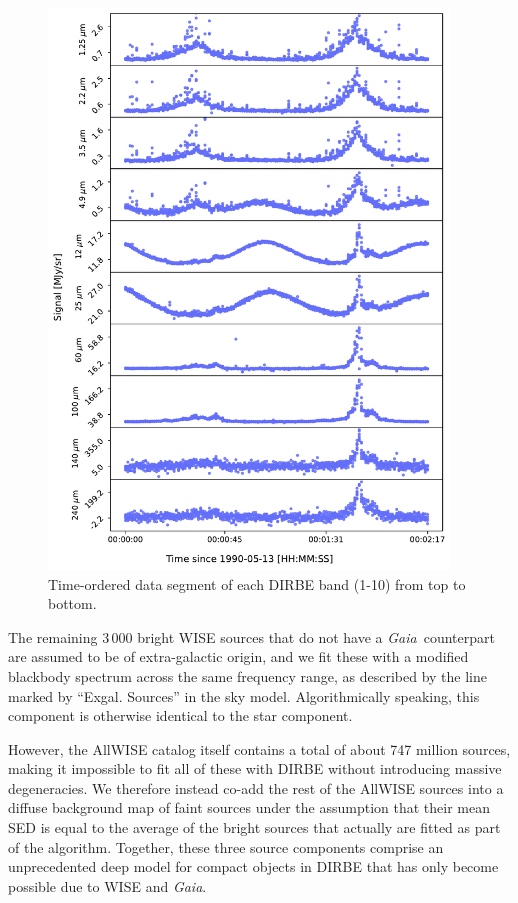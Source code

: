 \documentclass{aa}
\def\GAIA{\textit{Gaia}}
\begin{document}
\begin{figure}
  \centering
   	\includegraphics[width=0.95\textwidth]{figs/tod.pdf}
  	\caption{Time-ordered data segment of each DIRBE band (1-10) from top to bottom.}
	\label{fig: cios}
\end{figure}

The remaining 3\,000 bright WISE sources that do not have a
\GAIA\ counterpart are assumed to be of extra-galactic origin, and we
fit these with a modified blackbody spectrum across the same frequency
range, as described by the line marked by ``Exgal. Sources'' in the sky
model. Algorithmically speaking, this component is otherwise identical
to the star component.

However, the AllWISE catalog itself contains a total of about 747
million sources, making it impossible to fit all of these with DIRBE
without introducing massive degeneracies. We therefore instead co-add
the rest of the AllWISE sources into a diffuse background map of faint
sources under the assumption that their mean SED is equal to the
average of the bright sources that actually are fitted as part of the
algorithm. Together, these three source components comprise an
unprecedented deep model for compact objects in DIRBE that has only
become possible due to WISE and \GAIA.
\end{document}
